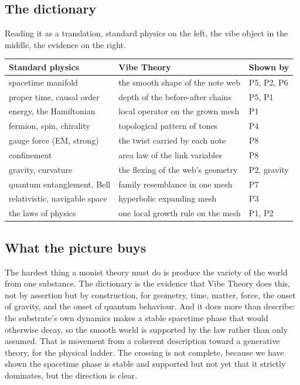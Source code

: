 \subsection{The dictionary}

Reading it as a translation, standard physics on the left, the vibe object in the middle, the evidence on the right.

\begin{center}
\begin{tabular}{>{\raggedright}p{4.2cm} >{\raggedright}p{5.2cm} l}
\toprule
\textbf{Standard physics} & \textbf{Vibe Theory} & \textbf{Shown by} \\
\midrule
spacetime manifold & the smooth shape of the note web & P5, P2, P6 \\
proper time, causal order & depth of the before-after chains & P5, P1 \\
energy, the Hamiltonian & local operator on the grown mesh & P1 \\
fermion, spin, chirality & topological pattern of tones & P4 \\
gauge force (EM, strong) & the twist carried by each note & P8 \\
confinement & area law of the link variables & P8 \\
gravity, curvature & the flexing of the web's geometry & P2, gravity \\
quantum entanglement, Bell & family resemblance in one mesh & P7 \\
relativistic, navigable space & hyperbolic expanding mesh & P3 \\
the laws of physics & one local growth rule on the mesh & P1, P2 \\
\bottomrule
\end{tabular}
\end{center}

\subsection{What the picture buys}

The hardest thing a monist theory must do is produce the variety of the world from one substance. The dictionary is the evidence that Vibe Theory does this, not by assertion but by construction, for geometry, time, matter, force, the onset of gravity, and the onset of quantum behaviour. And it does more than describe: the substrate's own dynamics makes a stable spacetime phase that would otherwise decay, so the smooth world is supported by the law rather than only assumed. That is movement from a coherent description toward a generative theory, for the physical ladder. The crossing is not complete, because we have shown the spacetime phase is stable and supported but not yet that it strictly dominates, but the direction is clear.
